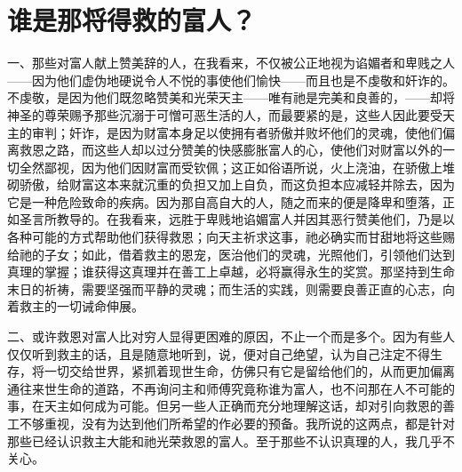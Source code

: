 
\chapter{谁是那将得救的富人？}


一、那些对富人献上赞美辞的人，在我看来，不仅被公正地视为谄媚者和卑贱之人——因为他们虚伪地硬说令人不悦的事使他们愉快——而且也是不虔敬和奸诈的。不虔敬，是因为他们既忽略赞美和光荣天主——唯有祂是完美和良善的，——却将神圣的尊荣赐予那些沉溺于可憎可恶生活的人，而最要紧的是，这些人因此要受天主的审判；奸诈，是因为财富本身足以使拥有者骄傲并败坏他们的灵魂，使他们偏离救恩之路，而这些人却以过分赞美的快感膨胀富人的心，使他们对财富以外的一切全然鄙视，因为他们因财富而受钦佩；这正如俗语所说，火上浇油，在骄傲上堆砌骄傲，给财富这本来就沉重的负担又加上自负，而这负担本应减轻并除去，因为它是一种危险致命的疾病。因为那自高自大的人，随之而来的便是降卑和堕落，正如圣言所教导的。在我看来，远胜于卑贱地谄媚富人并因其恶行赞美他们，乃是以各种可能的方式帮助他们获得救恩；向天主祈求这事，祂必确实而甘甜地将这些赐给祂的子女；如此，借着救主的恩宠，医治他们的灵魂，光照他们，引领他们达到真理的掌握；谁获得这真理并在善工上卓越，必将赢得永生的奖赏。那坚持到生命末日的祈祷，需要坚强而平静的灵魂；而生活的实践，则需要良善正直的心志，向着救主的一切诫命伸展。\par

二、或许救恩对富人比对穷人显得更困难的原因，不止一个而是多个。因为有些人仅仅听到救主的话，且是随意地听到，说，便对自己绝望，认为自己注定不得生存，将一切交给世界，紧抓着现世生命，仿佛只有它是留给他们的，从而更加偏离通往来世生命的道路，不再询问主和师傅究竟称谁为富人，也不问那在人不可能的事，在天主如何成为可能。但另一些人正确而充分地理解这话，却对引向救恩的善工不够重视，没有为达到他们所希望的作必要的预备。我所说的这两点，都是针对那些已经认识救主大能和祂光荣救恩的富人。至于那些不认识真理的人，我几乎不关心。\par

